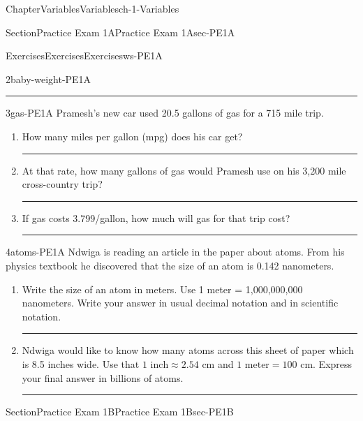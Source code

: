 \documentclass[twoside,11pt,]{book}
\newlength{\workspacestrutwidth}
\numberwithin{equation}{section}
\begin{document}
\begin{chapterptx}{Chapter}{Variables}{}{Variables}{}{}{ch-1-Variables}
\begin{sectionptx}{Section}{Practice Exam 1A}{}{Practice Exam 1A}{}{}{sec-PE1A}
\begin{exercises-subsection-numberless}{Exercises}{Exercises}{}{Exercises}{}{}{ws-PE1A}
\begin{divisionexercise}{2}{}{}{baby-weight-PE1A}
\begin{enumerate}[label=(\alph*),ref=\alph*]
\par\rule{\workspacestrutwidth}{0.5in}%
\end{enumerate}%
\end{divisionexercise}%
\clearpage
\begin{divisionexercise}{3}{}{}{gas-PE1A}%
Pramesh's new car used 20.5 gallons of gas for a 715 mile trip.%
\begin{enumerate}[label=(\alph*),ref=\alph*]%
\item{}How many miles per gallon (mpg) does his car get?%
\par\rule{\workspacestrutwidth}{2in}%
\item{}At that rate, how many gallons of gas would Pramesh use on his 3,200 mile cross-country trip?%
\par\rule{\workspacestrutwidth}{2in}%
\item{}If gas costs \textdollar{}3.799\slash{}gallon, how much will gas for that trip cost?%
\par\rule{\workspacestrutwidth}{2in}%
\end{enumerate}%
\end{divisionexercise}%
\clearpage
\begin{divisionexercise}{4}{}{}{atoms-PE1A}%
Ndwiga is reading an article in the paper about atoms. From his physics textbook he discovered that the size of an atom is 0.142 nanometers.%
\begin{enumerate}[label=(\alph*),ref=\alph*]%
\item{}Write the size of an atom in meters. Use 1 meter = 1,000,000,000 nanometers. Write your answer in usual decimal notation and in scientific notation.%
\par\rule{\workspacestrutwidth}{3in}%
\item{}Ndwiga would like to know how many atoms across this sheet of paper which is 8.5 inches wide. Use that \(1 \text{ inch} \approx 2.54 \text{ cm}\) and \(1 \text{ meter} = 100 \text{ cm}\). Express your final answer in billions of atoms.%
\par\rule{\workspacestrutwidth}{3in}%
\end{enumerate}%
\end{divisionexercise}%
\end{exercises-subsection-numberless}
\end{sectionptx}
%
%
\typeout{************************************************}
\typeout{************************************************}
%
\begin{sectionptx}{Section}{Practice Exam 1B}{}{Practice Exam 1B}{}{}{sec-PE1B}

\end{sectionptx}
\end{chapterptx}
\end{document}
